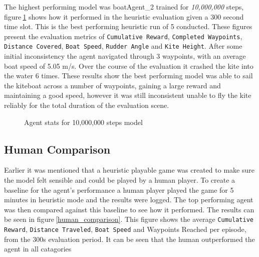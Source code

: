 The highest performing model was boatAgent\_2 trained for \textit{10,000,000} steps, figure$~$\ref{agent_stats} shows how it performed in the heuristic evaluation given a 300 second time slot. This is the best performing heuristic run of 5 conducted. These figures present the evaluation metrics of \texttt{Cumulative Reward}, \texttt{Completed Waypoints}, \texttt{Distance Covered}, \texttt{Boat Speed}, \texttt{Rudder Angle} and \texttt{Kite Height}. After some initial inconsistency the agent navigated through 3 waypoints, with an average boat speed of 5.05 m/s. Over the course of the evaluation it crashed the kite into the water 6 times. These results show the best performing model was able to sail the kiteboat across a number of waypoints, gaining a large reward and maintaining a good speed, however it was still inconsistent unable to fly the kite reliably for the total duration of the evaluation scene. 
\begin{figure}
    \centering
    \caption{Agent stats for 10,000,000 steps model}\label{agent_stats}
\end{figure}

\subsection*{Human Comparison}\label{hcomp}
Earlier it was mentioned that a heuristic playable game was created to make sure the model felt sensible and could be played by a human player. To create a baseline for the agent's performance a human player played the game for 5 minutes in heuristic mode and the results were logged. The top performing agent was then compared against this baseline to see how it performed. The results can be seen in figure$~$\ref{human_comparison}. This figure shows the average \texttt{Cumulative Reward}, \texttt{Distance Traveled}, \texttt{Boat Speed} and {Waypoints Reached} per episode, from the 300s evaluation period. It can be seen that the human outperformed the agent in all catagories

